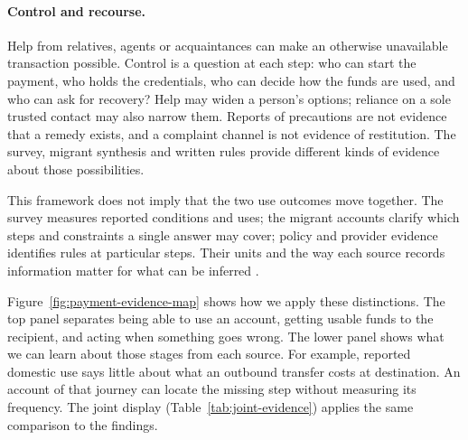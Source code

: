 \paragraph{Control and recourse.} Help from relatives, agents or acquaintances can make an otherwise unavailable transaction possible. Control is a question at each step: who can start the payment, who holds the credentials, who can decide how the funds are used, and who can ask for recovery? Help may widen a person's options; reliance on a sole trusted contact may also narrow them. Reports of precautions are not evidence that a remedy exists, and a complaint channel is not evidence of restitution. The survey, migrant synthesis and written rules provide different kinds of evidence about those possibilities.

This framework does not imply that the two use outcomes move together. The survey measures reported conditions and uses; the migrant accounts clarify which steps and constraints a single answer may cover; policy and provider evidence identifies rules at particular steps. Their units and the way each source records information matter for what can be inferred \citep{adcockCollier2001,humphreysJacobs2023}.

Figure~\ref{fig:payment-evidence-map} shows how we apply these distinctions. The top panel separates being able to use an account, getting usable funds to the recipient, and acting when something goes wrong. The lower panel shows what we can learn about those stages from each source. For example, reported domestic use says little about what an outbound transfer costs at destination. An account of that journey can locate the missing step without measuring its frequency. The joint display (Table~\ref{tab:joint-evidence}) applies the same comparison to the findings.


